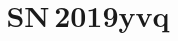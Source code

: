 \documentclass[twocolumn]{aastex63}
\newcommand{\sn}{SN\,2019yvq}
\begin{document}
\title{\sn\  }


\end{document}
